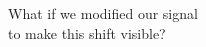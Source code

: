 \documentclass[preview]{standalone}
\begin{document}
\begin{center}
What if we modified our signal\\to make this shift visible?
\end{center}
\end{document}
